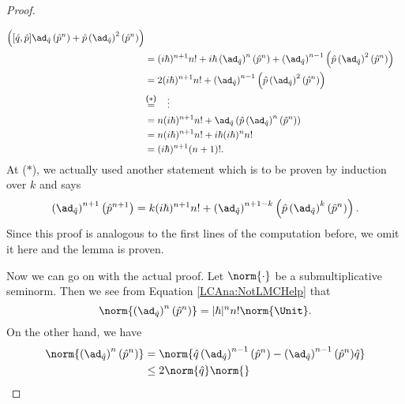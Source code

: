 \begin{proof}
\begin{subproof}
\begin{align*}
			\left(
				[\hat{q}, \hat{p}]
				\ad_{\hat{q}} \left( \hat{p}^n \right)
				+
				\hat{p}
				\left( \ad_{\hat{q}} \right)^2
				\left( \hat{p}^n \right)
			\right)
			\\
			& =
			(i \hbar)^{n + 1} n!
			+
			i \hbar
			\left( \ad_{\hat{q}} \right)^{n}
			\left( \hat{p}^n \right)
			+
			\left( \ad_{\hat{q}} \right)^{n-1}
			\left(
				\hat{p}
				\left( \ad_{\hat{q}} \right)^2
				\left( \hat{p}^n \right)
			\right)
			\\
			& =
			2 (i \hbar)^{n+1} n!
			+
			\left( \ad_{\hat{q}} \right)^{n-1}
			\left(
				\hat{p}
				\left( \ad_{\hat{q}} \right)^2
				\left( \hat{p}^n \right)
			\right)
			\\
			& \ot{($*$)}{=} 
			\quad \vdots
			\\
			& =
			n (i \hbar)^{n+1} n!
			+
			\ad_{\hat{q}}
			\left(
				\hat{p}
				\left( \ad_{\hat{q}} \right)^n
				\left( \hat{p}^n \right)
			\right)
			\\
			& =
			n (i \hbar)^{n+1} n!
			+
			i \hbar (i \hbar)^n n!
			\\
			& =
			(i \hbar)^{n + 1} (n + 1)!.
		\end{align*}
		At ($*$), we actually used another statement which is to be 
		proven by induction over $k$ and says
		\begin{equation*}
			\left( \ad_{\hat{q}} \right)^{n + 1}
			\left( \hat{p}^{n + 1} \right)
			=
			k (i \hbar)^{n + 1} n!
			+
			\left( \ad_{\hat{q}} \right)^{n + 1 - k}
			\left(
				\hat{p}
				\left( \ad_{\hat{q}} \right)^k
				\left( \hat{p}^n \right)
			\right).
		\end{equation*}
		Since this proof is analogous to the first lines of the 
		computation before, we omit it here and the lemma is proven.
	\end{subproof}	
	Now we can go on with the actual proof. Let $\norm{\cdot}$ be a 
	submultiplicative seminorm. Then we see from Equation 
	\eqref{LCAna:NotLMCHelp} that
	\begin{equation*}
		\norm{
			\left( \ad_{\hat{q}} \right)^n
			(\hat{p}^n)
		}
		=
		|\hbar|^n n! \norm{ \Unit }.
	\end{equation*}
	On the other hand, we have
	\begin{align*}
		\norm{
			\left( \ad_{\hat{q}} \right)^n
			(\hat{p}^n)
		}
		& =
		\norm{
			\hat{q}
			\left( \ad_{\hat{q}} \right)^{n-1}
			(\hat{p}^n)
			-
			\left( \ad_{\hat{q}} \right)^{n-1}
			(\hat{p}^n)
			\hat{q}
		}
		\\
		& \leq
		2 \norm{\hat{q}}
		\norm{
}
\end{align*}
\end{proof}
